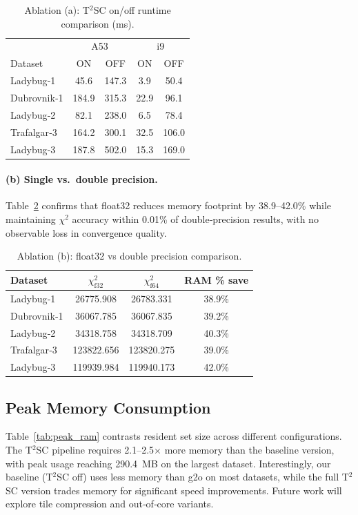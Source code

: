 \begin{table}[!htbp]
\caption{Ablation (a): T$^{2}$SC on/off runtime comparison (ms).}
\label{tab:ablate_t2sc}
\centering
\begin{tabular}{@{}lcccc@{}}
\toprule
& \multicolumn{2}{c}{A53} & \multicolumn{2}{c}{i9} \\
\cmidrule(lr){2-3} \cmidrule(lr){4-5}
Dataset & ON & OFF & ON & OFF \\
\midrule
Ladybug‑1   & 45.6  & 147.3 & 3.9  & 50.4 \\
Dubrovnik‑1 & 184.9 & 315.3 & 22.9 & 96.1 \\
Ladybug‑2   & 82.1  & 238.0 & 6.5  & 78.4 \\
Trafalgar‑3 & 164.2 & 300.1 & 32.5 & 106.0 \\
Ladybug‑3   & 187.8 & 502.0 &  15.3 & 169.0 \\
\bottomrule
\end{tabular}
\end{table}

\paragraph{(b) Single vs.\ double precision.}  Table~\ref{tab:ablate_precision} confirms that 
float32 reduces memory footprint by 38.9–42.0\% while maintaining $\chi^{2}$ accuracy within 
0.01\% of double‑precision results, with no observable loss in convergence quality.

\begin{table}[!htbp]
\caption{Ablation (b): float32 vs double precision comparison.}
\label{tab:ablate_precision}
\centering
\begin{tabular}{@{}lccc@{}}
\toprule
Dataset & $\chi^{2}_{\text{f32}}$ & $\chi^{2}_{\text{f64}}$ & RAM \% save \\
\midrule
Ladybug‑1   & 26775.908 & 26783.331 & 38.9\% \\
Dubrovnik‑1 & 36067.785 & 36067.835 & 39.2\% \\
Ladybug‑2   & 34318.758 & 34318.709 & 40.3\% \\
Trafalgar‑3 & 123822.656 & 123820.275 & 39.0\% \\
Ladybug‑3   & 119939.984 & 119940.173 & 42.0\% \\
\bottomrule
\end{tabular}
\end{table}

\subsection{Peak Memory Consumption}
\label{subsec:results_ram}
Table~\ref{tab:peak_ram} contrasts resident set size across different configurations. 
The T$^{2}$SC pipeline requires 2.1–2.5$\times$ more memory than the baseline version, 
with peak usage reaching \SI{290.4}{MB} on the largest dataset. Interestingly, our baseline 
(T$^{2}$SC off) uses less memory than g2o on most datasets, while the full T$^{2}$SC version 
trades memory for significant speed improvements. Future work will explore tile compression 
and out‑of‑core variants.


